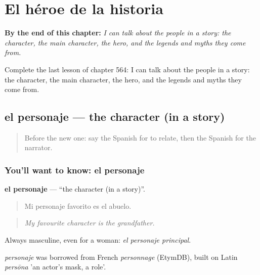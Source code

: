 
\chapter{El héroe de la historia}
\label{ch:es-el-heroe-de-la-historia}

\begin{chapteropening}
\textbf{By the end of this chapter:} \emph{I can talk about the people in a story: the character, the main character, the hero, and the legends and myths they come from.}

Complete the last lesson of chapter 564: I can talk about the people in a story: the character, the main character, the hero, and the legends and myths they come from.
\end{chapteropening}

\section[el personaje]{el personaje — the character (in a story)}

\label{lesson:ES-C564-personaje}



\begin{quote}
Before the new one: say the Spanish for to relate, then the Spanish for the narrator.
\end{quote}

\subsection*{You'll want to know: el personaje}
\textbf{el personaje} — \textquotedblleft{}the character (in a story)\textquotedblright{}.

\begin{quote}
Mi personaje favorito es el abuelo.
\end{quote}

\begin{quote}
\emph{My favourite character is the grandfather.}
\end{quote}

Always masculine, even for a woman: \emph{el personaje principal}.

\begin{cousinweb}
\emph{personaje} was borrowed from French \emph{personnage} (EtymDB), built on Latin \emph{persōna} 'an actor's mask, a role'.
\end{cousinweb}


